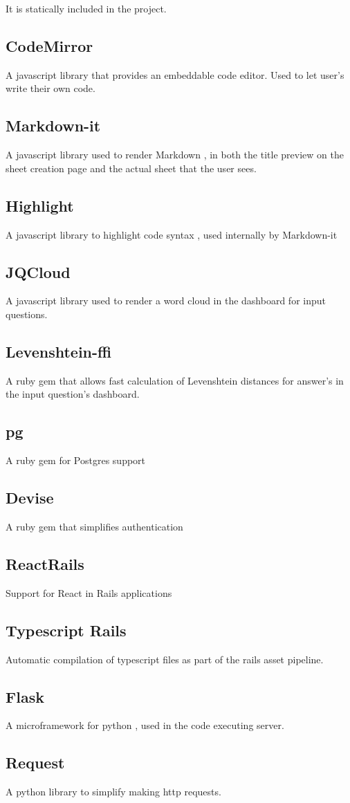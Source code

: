 	It is statically included in the project.
	
\subsection{CodeMirror}
A javascript library that provides an embeddable code editor. Used to let user's write their own code.

\subsection{Markdown-it}
A javascript library used to render Markdown , in both the title preview on the sheet creation page and the actual sheet that the user sees.

\subsection{Highlight}
A javascript library to highlight code syntax , used internally by Markdown-it
	
\subsection{JQCloud}
A javascript library used to render a word cloud in the dashboard for input questions.

\subsection{Levenshtein-ffi}
A ruby gem that allows fast calculation of Levenshtein distances for answer's in the input question's dashboard.

\subsection{pg}
A ruby gem for Postgres support

\subsection{Devise}
A ruby gem that simplifies authentication

\subsection{ReactRails}
Support for React in Rails applications

\subsection{Typescript Rails}
Automatic compilation of typescript files as part of the rails asset pipeline.

\subsection{Flask}
A microframework for python , used in the code executing server.

\subsection{Request}
A python library to simplify making http requests.

